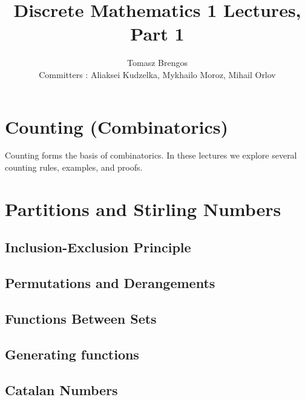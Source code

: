 \documentclass{article}
\title{Discrete Mathematics 1 Lectures, Part 1}
\author{Tomasz Brengos \\  
Committers : Aliaksei Kudzelka, Mykhailo Moroz, Mihail Orlov}
\date{}
\newcommand{\includelectureSub}[1]{%
  \begingroup
    \renewcommand{\section}{\subsection}%
  \endgroup
}
\newcommand{\includelectureNoHeader}[1]{%
  \begingroup
    \let\maketitle\relax%
  \endgroup
}
\begin{document}
\maketitle
\cleardoublepage %

\section{Counting (Combinatorics)}
Counting forms the basis of combinatorics. In these lectures we explore several counting rules, examples, and proofs.
\includelectureSub{Counting}

\section{Partitions and Stirling Numbers}
\includelectureSub{Partitions_StirlingNumbers}

\section{Inclusion-Exclusion Principle}
\includelectureNoHeader{Inclusion_Exclusion}

\section{Permutations and Derangements}
\includelectureSub{Permutations_Derangements}

\section{Functions Between Sets}
\includelectureNoHeader{Functions_between_sets}

\section{Generating functions}
\includelectureSub{Generating_functions}

\section{Catalan Numbers}
\includelectureSub{Catalan_Numbers}

\newpage             %
\tableofcontents
\clearpage 
\end{document}
